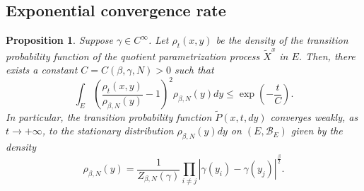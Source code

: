 \documentclass[11pt]{article}
\numberwithin{equation}{section}
\newtheorem{proposition}[theorem]{Proposition}
\theoremstyle{definition}
\begin{document}
\subsection{Exponential convergence rate}
\begin{proposition}\label{prop::exp_convergence_of_density_in_E}
Suppose $\gamma\in C^{\infty}$. Let $\rho_{t}(x,y)$ be the density of the transition probability function of the quotient parametrization process $\tilde X^{x}$ in $E$.  Then, there exists a constant $C = C(\beta,\gamma, N)>0$ such that 
\begin{equation}\label{eq::Poincare_inequality}
    \int_{E}\left(\frac{\rho_{t}(x,y)}{\rho_{\beta,N}(y)}-1\right)^2\rho_{\beta,N}(y) dy
    \le \exp\left(-\frac{t}{C}\right).    
\end{equation}
In particular, the transition probability function $\tilde P(x, t, dy)$ converges weakly, as $t\to+\infty$, to the stationary distribution $\rho_{\beta,N}(y)dy$ on $(E, \mathcal{B}_{E})$ given by the density 
\[
    \rho_{\beta, N}(y) 
    = \frac{1}{Z_{\beta, N}(\gamma)}\prod_{i\neq j}|\gamma(y_{i})-\gamma(y_{j})|^{\frac{\beta}{2}}.
\]
\end{proposition}
\end{document}
